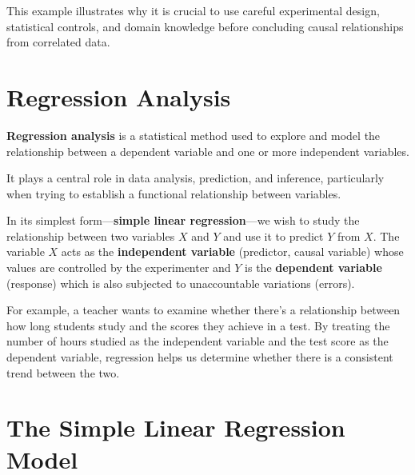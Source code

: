 \documentclass[twoside]{book}
\begin{document}
This example illustrates why it is crucial to use careful experimental design, statistical controls, and domain knowledge before concluding causal relationships from correlated data.





\section{Regression Analysis}

\begin{textbox}
    \textbf{Regression analysis} is a statistical method used to explore and model the relationship between a dependent variable and one or more independent variables.
\end{textbox}
 It plays a central role in data analysis, prediction, and inference, particularly when trying to establish a functional relationship between variables.

In its simplest form—\textbf{simple linear regression}—we wish to study the relationship between two variables $X$ and $Y$ and use it to predict $Y$ from $X$. The variable $X$ acts as the \textbf{independent variable} (predictor, causal variable) whose values are controlled by the experimenter and $Y$ is the \textbf{dependent variable} (response) which is also subjected to unaccountable variations (errors).

For example, a teacher wants to examine whether there's a relationship between how long students study and the scores they achieve in a test. By treating the number of hours studied as the independent variable and the test score as the dependent variable, regression helps us determine whether there is a consistent trend between the two.

\section{The Simple Linear Regression Model}
\end{document}
